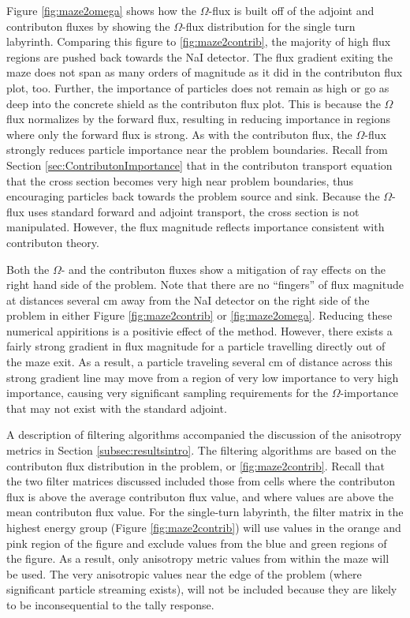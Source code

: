 Figure \ref{fig:maze2omega} shows how the $\Omega$-flux is built off of the
adjoint and contributon fluxes by showing the $\Omega$-flux distribution for the
single turn labyrinth. Comparing this figure to \ref{fig:maze2contrib}, the
majority of high flux regions are pushed back towards the NaI detector. The
flux gradient exiting the maze does not span as many orders of magnitude as it
did in the contributon flux plot, too. Further, the importance of particles does
not remain as high or go as deep into the concrete shield as the contributon
flux plot. This is because the $\Omega$ flux normalizes by the forward flux,
resulting in reducing importance in regions where only the forward flux is
strong. As with the contributon flux, the $\Omega$-flux strongly reduces
particle importance near the problem boundaries. Recall from Section
\ref{sec:ContributonImportance} that in the contributon transport equation that
the cross section becomes very high near problem boundaries, thus encouraging
particles back towards the problem source and sink. Because the $\Omega$-flux
uses standard forward and adjoint transport, the cross section is not
manipulated. However, the flux magnitude reflects importance consistent with
contributon theory.

Both the $\Omega$- and the contributon fluxes show a mitigation of ray effects
on the right hand side of the problem. Note that there are no ``fingers'' of
flux magnitude at distances several cm away from the NaI detector on the right
side of the problem in either Figure \ref{fig:maze2contrib} or
\ref{fig:maze2omega}. Reducing these numerical appiritions is a positivie effect
of the method. However, there exists a fairly strong gradient in flux magnitude
for a particle travelling directly out of the maze exit. As a result, a particle
traveling several cm of distance across this strong gradient line may move from
a region of very low importance to very high importance, causing very
significant sampling requirements for the $\Omega$-importance that may not exist
with the standard adjoint.

A description of filtering algorithms accompanied
the discussion of the anisotropy metrics in Section
\ref{subsec:resultsintro}. The filtering algorithms are based on the contributon
flux distribution in the problem, or \ref{fig:maze2contrib}. Recall that the two
filter matrices discussed included those from cells where the contributon flux
is above the average contributon flux value, and where values are above the mean
contributon flux value. For the single-turn labyrinth, the filter matrix in the
highest energy group (Figure \ref{fig:maze2contrib}) will use values in the
orange and pink region of the figure and exclude values from the blue and green
regions of the figure. As a result, only anisotropy metric values from within
the maze will be used. The very anisotropic values near the edge of the problem
(where significant particle streaming exists), will not be included because they
are likely to be inconsequential to the tally response.

